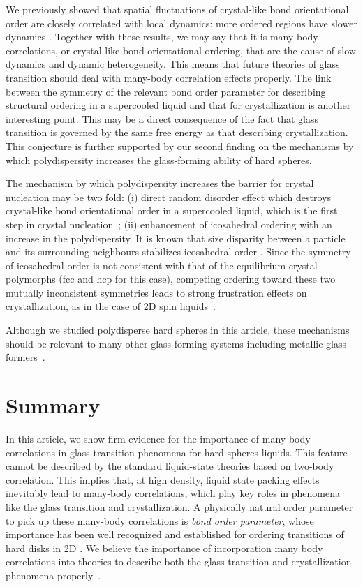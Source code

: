 \documentclass[twocolumn,superscriptaddress]{revtex4-1}
\begin{document}
We previously showed that spatial fluctuations of crystal-like bond orientational order are closely correlated with local dynamics: 
more ordered regions have slower dynamics \cite{KAT,WT,ShintaniNP,tanaka,Kawasaki3D,mathieu_icosahedra}. 
Together with these results, we may say that it is many-body correlations, or crystal-like bond orientational ordering, that 
are the cause of slow dynamics and dynamic heterogeneity.  
This means that future theories of glass transition should deal with many-body correlation effects properly. 
The link between the symmetry of the relevant bond order parameter for describing structural ordering 
in a supercooled liquid and that for crystallization is another interesting point. 
This may be a direct consequence of the fact that glass transition is governed by the same free energy as that 
describing crystallization. This conjecture is further supported by our second finding on the mechanisms by which 
polydispersity increases the glass-forming ability of hard spheres.  

The mechanism by which polydispersity increases the barrier for crystal nucleation may be two fold: 
(i) direct random disorder effect which destroys crystal-like bond orientational order in a supercooled liquid,
which is the first step in crystal nucleation~\cite{russo_hs};
(ii) enhancement of icosahedral ordering with an increase in the polydispersity.
It is known that size disparity between a particle and its surrounding neighbours stabilizes icosahedral order \cite{Shimono2012}. 
Since the symmetry of icosahedral order is not consistent with that of the equilibrium crystal polymorphs (fcc and hcp for this case), 
competing ordering toward these two mutually inconsistent symmetries leads to strong frustration effects on crystallization, as in the case of 
2D spin liquids~\cite{ShintaniNP,STNM}. 

Although we studied polydisperse hard spheres in this article, these mechanisms should be relevant to many other 
glass-forming systems including metallic glass formers~\cite{Jakse2008,Hwang2012}. 

\section{Summary}


In this article, we show firm evidence for the importance of many-body correlations in glass transition phenomena 
for hard spheres liquids. This feature cannot be described by the standard liquid-state theories based on two-body correlation. 
This implies that, at high density, liquid state packing effects inevitably lead to many-body correlations, which play 
key roles in phenomena like the glass transition and crystallization. 
A physically natural order parameter to pick up these many-body correlations is \emph{bond order parameter}, whose importance 
has been well recognized and established for ordering transitions of hard disks in 2D \cite{NelsonB}. 
We believe the importance of incorporation many body correlations into theories to describe
both the glass transition and crystallization phenomena properly~\cite{TanakaJSP,TanakaR}.
\end{document}
